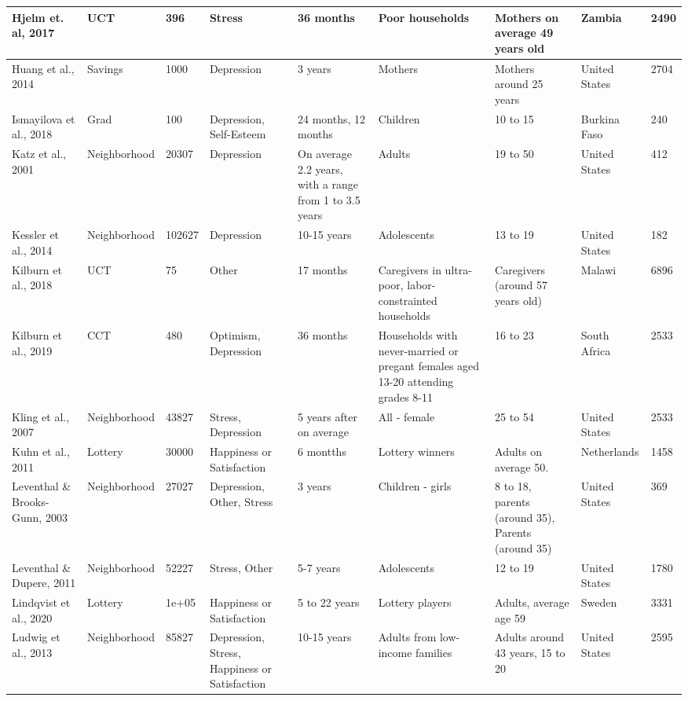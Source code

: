 \begin{table}[ht]
\begin{tabular}{p{1.8cm}p{1.7cm}p{1.3 cm}p{2cm}p{1.7cm}p{2.0cm}p{1cm}p{1.2cm}p{1cm}}
   \hline
Hjelm et. al, 2017 & UCT & 396 & Stress & 36 months & Poor households & Mothers on average 49 years old & Zambia & 2490 \\ 
   \hline
Huang et al., 2014 & Savings & 1000 & Depression & 3 years & Mothers & Mothers around 25 years & United States & 2704 \\ 
   \hline
Ismayilova et al., 2018 & Grad & 100 & Depression, Self-Esteem & 24 months, 12 months & Children & 10 to 15 & Burkina Faso & 240 \\ 
   \hline
Katz et al., 2001 & Neighborhood & 20307 & Depression & On average 2.2 years, with a range from 1 to 3.5 years & Adults & 19 to 50 & United States & 412 \\ 
   \hline
Kessler et al., 2014 & Neighborhood & 102627 & Depression & 10-15 years & Adolescents & 13 to 19 & United States & 182 \\ 
   \hline
Kilburn et al., 2018 & UCT & 75 & Other & 17 months & Caregivers in ultra-poor, labor-constrainted households & Caregivers (around 57 years old) & Malawi & 6896 \\ 
   \hline
Kilburn et al., 2019 & CCT & 480 & Optimism, Depression & 36 months & Households with never-married or pregant females aged 13-20 attending grades 8-11 & 16 to 23 & South Africa & 2533 \\ 
   \hline
Kling et al., 2007 & Neighborhood & 43827 & Stress, Depression & 5 years after on average & All - female & 25 to 54 & United States & 2533 \\ 
   \hline
Kuhn et al., 2011 & Lottery & 30000 & Happiness or Satisfaction & 6 montths & Lottery winners & Adults on average 50. & Netherlands & 1458 \\ 
   \hline
Leventhal \& Brooks-Gunn, 2003 & Neighborhood & 27027 & Depression, Other, Stress & 3 years & Children - girls & 8 to 18, parents (around 35), Parents (around 35) & United States & 369 \\ 
   \hline
Leventhal \& Dupere, 2011 & Neighborhood & 52227 & Stress, Other & 5-7 years & Adolescents & 12 to 19 & United States & 1780 \\ 
   \hline
Lindqvist et al., 2020 & Lottery & 1e+05 & Happiness or Satisfaction & 5 to 22 years & Lottery players & Adults, average age 59 & Sweden & 3331 \\ 
   \hline
Ludwig et al., 2013 & Neighborhood & 85827 & Depression, Stress, Happiness or Satisfaction & 10-15 years & Adults from low-income families & Adults around 43 years, 15 to 20 & United States & 2595 \\ 

\end{tabular}
\end{table}
